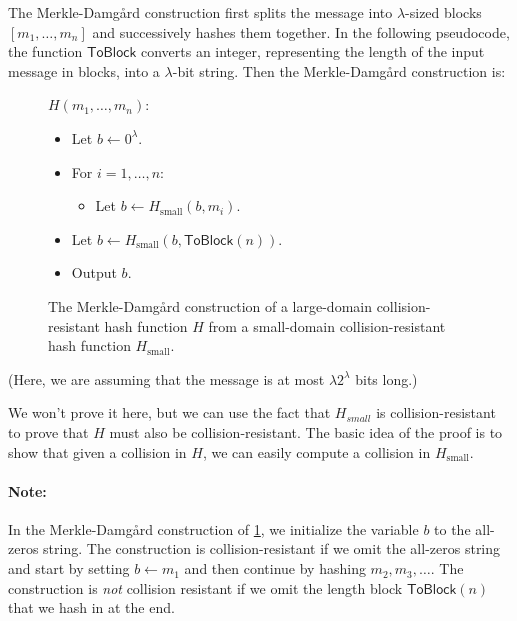 The Merkle-Damg\aa{}rd construction first splits the
message into $\lambda$-sized blocks $[m_1, \ldots, m_n]$ and successively hashes them together.
In the following pseudocode,
the function $\mathsf{ToBlock}$ converts an integer, representing the length of the input message
in blocks, into a $\lambda$-bit string.
Then the Merkle-Damg\aa{}rd construction is:
\begin{figure}
\begin{framed}
\noindent
  $H(m_1, \dots, m_n)$: \qquad {}
\begin{itemize}[noitemsep]
  \item Let $b \gets 0^\lambda$.
  \item For $i = 1, \dots, n$:
   \begin{itemize}
     \item Let $b \gets H_\text{small}(b, m_i)$.
   \end{itemize}
 \item Let $b \gets H_\text{small}(b, \mathsf{ToBlock}(n))$.
 \item Output $b$.
\end{itemize}
\end{framed}
\caption{The Merkle-Damg\aa{}rd construction of a large-domain
collision-resistant hash function $H$ from a small-domain
collision-resistant hash function $H_\text{small}$.}
  \label{fig:md}
\end{figure}
(Here, we are assuming that the message is at most 
$\lambda 2^{\lambda}$ bits long.)

We won't prove it here, but we can use the fact that $H_{small}$ is collision-resistant to prove that $H$ must also be collision-resistant. The basic idea of the proof is to show that given a collision in $H$, we can easily compute a collision in $H_{\text{small}}$. 

\paragraph{Note:} In 
the Merkle-Damg\aa{}rd construction of \cref{fig:md},
we initialize the variable $b$ to the all-zeros string.
The construction is collision-resistant if we omit the all-zeros
string and start by setting $b \gets m_1$ and then continue by hashing $m_2, m_3, \dots$.
The construction is \emph{not} collision resistant if we omit the length block
$\mathsf{ToBlock}(n)$ that we hash in at the end.


